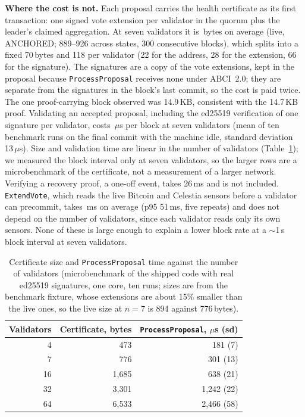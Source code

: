 \textbf{Where the cost is not.} Each proposal carries the health certificate as
its first transaction: one signed vote extension per validator in the quorum plus
the leader's claimed aggregation. At seven validators it is \resProposalBytes\,bytes on
average (live, ANCHORED; 889--926 across states, 300 consecutive blocks), which
splits into a fixed 70\,bytes and 118 per validator (22 for the address, 28 for
the extension, 66 for the signature). The signatures are a copy of the vote
extensions, kept in the proposal because \texttt{ProcessProposal} receives none
under ABCI~2.0; they are separate from the signatures in the block's last commit,
so the cost is paid twice. The one proof-carrying
block observed was 14.9\,KB, consistent with the 14.7\,KB proof.
Validating an accepted proposal, including the ed25519 verification of one
signature per validator, costs \resValidationUs\,$\mu$s per block at seven
validators (mean of ten benchmark runs on the final commit with the machine idle, standard deviation 13\,$\mu$s).
Size and
validation time are linear in the number of validators
(Table~\ref{tab:cert-scaling}); we measured the block interval only at seven
validators, so the larger rows are a microbenchmark of the certificate, not a
measurement of a larger network. Verifying a recovery proof, a one-off event,
takes 26\,ms and is not included. \texttt{ExtendVote}, which reads the live
Bitcoin and Celestia sensors before a validator can precommit, takes
\resExtendVoteMs\,ms on average (p95 51\,ms, five repeats) and does not depend on
the number of validators, since each validator reads only its own sensors. None
of these is large enough to explain a lower block rate at a $\sim$1\,s block
interval at seven validators.

\begin{table}[tbp]
\caption{Certificate size and \texttt{ProcessProposal} time against the number of
validators (microbenchmark of the shipped code with real ed25519 signatures, one
core, ten runs; sizes are from the benchmark fixture, whose extensions are about
15\% smaller than the live ones, so the live size at $n{=}7$ is 894 against 776\,bytes).}
\label{tab:cert-scaling}
\centering
\footnotesize
\begin{tabular}{@{}rrr@{}}
\toprule
\textbf{Validators} & \textbf{Certificate, bytes} & \textbf{\texttt{ProcessProposal}, $\mu$s (sd)} \\
\midrule
4 & 473 & 181 (7) \\
7 & 776 & 301 (13) \\
16 & 1{,}685 & 638 (21) \\
32 & 3{,}301 & 1{,}242 (22) \\
64 & 6{,}533 & 2{,}466 (58) \\
\bottomrule
\end{tabular}
\end{table}

